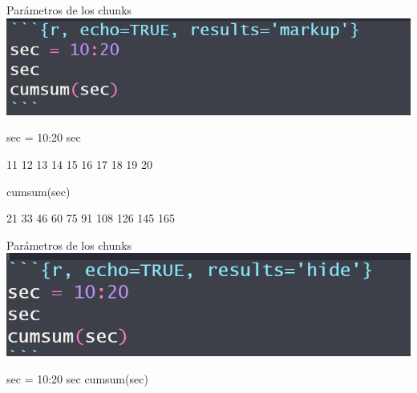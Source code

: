 \documentclass[
  ignorenonframetext,
  aspectratio=169]{beamer}
\newenvironment{Shaded}{\begin{snugshade}}{\end{snugshade}}
\newcommand{\DecValTok}[1]{\textcolor[rgb]{0.00,0.00,0.81}{#1}}
\newcommand{\FunctionTok}[1]{\textcolor[rgb]{0.00,0.00,0.00}{#1}}
\newcommand{\NormalTok}[1]{#1}
\newcommand{\OtherTok}[1]{\textcolor[rgb]{0.56,0.35,0.01}{#1}}
\newcommand{\SpecialCharTok}[1]{\textcolor[rgb]{0.00,0.00,0.00}{#1}}
\let\oldverbatim\verbatim
\let\endoldverbatim\endverbatim
\renewenvironment{verbatim}{\tiny\oldverbatim}{\endoldverbatim}
\begin{document}
\begin{frame}[fragile]{Parámetros de los chunks}
\protect\hypertarget{paruxe1metros-de-los-chunks-7}{}
\includegraphics[width=0.6\linewidth]{Imgs/para_chunks_03}

\begin{Shaded}
\begin{Highlighting}[]
\NormalTok{sec }\OtherTok{=} \DecValTok{10}\SpecialCharTok{:}\DecValTok{20}
\NormalTok{sec}
\end{Highlighting}
\end{Shaded}

\begin{verbatim}
 [1] 10 11 12 13 14 15 16 17 18 19 20
\end{verbatim}

\begin{Shaded}
\begin{Highlighting}[]
\FunctionTok{cumsum}\NormalTok{(sec)}
\end{Highlighting}
\end{Shaded}

\begin{verbatim}
 [1]  10  21  33  46  60  75  91 108 126 145 165
\end{verbatim}
\end{frame}

\begin{frame}[fragile]{Parámetros de los chunks}
\protect\hypertarget{paruxe1metros-de-los-chunks-8}{}
\includegraphics[width=0.6\linewidth]{Imgs/parametros_chunk_4}

\begin{Shaded}
\begin{Highlighting}[]
\NormalTok{sec }\OtherTok{=} \DecValTok{10}\SpecialCharTok{:}\DecValTok{20}
\NormalTok{sec}
\FunctionTok{cumsum}\NormalTok{(sec)}
\end{Highlighting}
\end{Shaded}
\end{frame}
\end{document}
